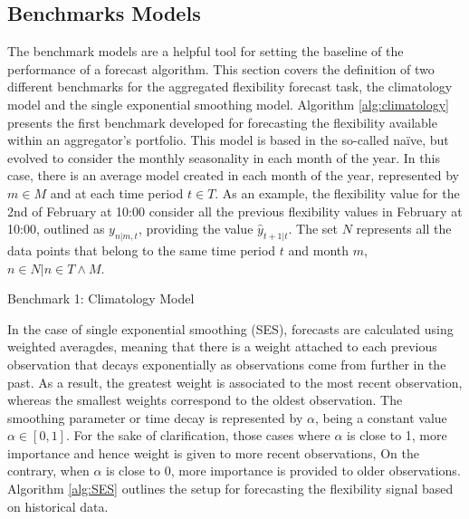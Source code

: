 \subsection{Benchmarks Models}

The benchmark models are a helpful tool for setting the baseline of the performance of a forecast algorithm. This section covers the definition of two different benchmarks for the aggregated flexibility forecast task, the climatology model and the single exponential smoothing model. Algorithm \ref{alg:climatology} presents the first benchmark developed for forecasting the flexibility available within an aggregator's portfolio. This model is based in the so-called na\"{i}ve, but evolved to consider the monthly seasonality in each month of the year. In this case, there is an average model created in each month of the year, represented by $m \in M$ and at each time period $t \in T$. As an example, the flexibility value for the 2nd of February at 10:00 consider all the previous flexibility values in February at 10:00, outlined as $y_{n|m,t}$,  providing the value $\hat{y}_{t+1|t}$. The set $N$ represents all the data points that belong to the same time period $t$ and month $m$, $n \in N | n \in  T \wedge M$. 

\begin{algorithm}
	\SetAlgoLined
	\caption{Benchmark 1: Climatology Model}
	\label{alg:climatology}
\end{algorithm}

In the case of single exponential smoothing (SES), forecasts are calculated using weighted averagdes, meaning that there is a weight attached to each previous observation that decays exponentially as observations come from further in the past. As a result, the greatest weight is associated to the most recent observation, whereas the smallest weights correspond to the oldest observation. The smoothing parameter or time decay is represented by $\alpha$, being a constant value $\alpha \in [0,1]$. For the sake of clarification, those cases where $\alpha$ is close to 1, more importance and hence weight is given to more recent observations, On the contrary, when $\alpha$ is close to 0, more importance is provided to older observations. Algorithm \ref{alg:SES} outlines the setup for forecasting the flexibility signal based on historical data. 


